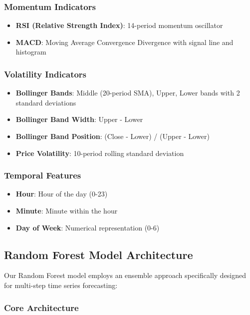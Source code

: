 \documentclass[11pt,a4paper]{article}
\begin{document}
\subsubsection{Momentum Indicators}
\begin{itemize}
    \item \textbf{RSI (Relative Strength Index)}: 14-period momentum oscillator
    \item \textbf{MACD}: Moving Average Convergence Divergence with signal line and histogram
\end{itemize}

\subsubsection{Volatility Indicators}
\begin{itemize}
    \item \textbf{Bollinger Bands}: Middle (20-period SMA), Upper, Lower bands with 2 standard deviations
    \item \textbf{Bollinger Band Width}: Upper - Lower
    \item \textbf{Bollinger Band Position}: (Close - Lower) / (Upper - Lower)
    \item \textbf{Price Volatility}: 10-period rolling standard deviation
\end{itemize}

\subsubsection{Temporal Features}
\begin{itemize}
    \item \textbf{Hour}: Hour of the day (0-23)
    \item \textbf{Minute}: Minute within the hour
    \item \textbf{Day of Week}: Numerical representation (0-6)
\end{itemize}

\subsection{Random Forest Model Architecture}

Our Random Forest model employs an ensemble approach specifically designed for multi-step time series forecasting:

\subsubsection{Core Architecture}
\end{document}
